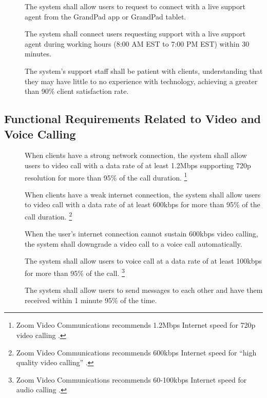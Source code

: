 \begin{description}
    \item[\textbf{\showfunchelpcounter}]
        The system shall allow users to request to connect with a live support
            agent from the GrandPad app or GrandPad tablet.
    \item[\textbf{\showfunchelpcounter}]
        The system shall connect users requesting support with a live support
            agent during working hours (8:00 AM EST to 7:00 PM EST) within 30
            minutes.
    \item[\textbf{\showfunchelpcounter}]
        The system's support staff shall be patient with clients, understanding
            that they may have little to no experience with technology,
            achieving a greater than 90\% client satisfaction rate.
\end{description}

\subsection*{Functional Requirements Related to Video and Voice Calling}

\begin{description}
    \item[\textbf{\showfunccallcounter}]
        When clients have a strong network connection, the system shall allow
            users to video call with a data rate of at least 1.2Mbps supporting
            720p resolution for more than 95\% of the call duration.
        \footnote{Zoom Video Communications recommends 1.2Mbps Internet speed
            for 720p video calling \cite{zoom_system_requirements}.}
    \item[\textbf{\showfunccallcounter}]
        When clients have a weak internet connection, the system shall allow
            users to video call with a data rate of at least 600kbps for more
            than 95\% of the call duration.
        \footnote{Zoom Video Communications recommends 600kbps Internet speed
            for ``high quality video calling'' \cite{zoom_system_requirements}.}
    \item[\textbf{\showfunccallcounter}]
        When the user's internet connection cannot sustain 600kbps video
            calling, the system shall downgrade a video call to a voice call
            automatically.
    \item[\textbf{\showfunccallcounter}]
        The system shall allow users to voice call at a data rate of at least
            100kbps for more than 95\% of the call.
        \footnote{Zoom Video Communications recommends 60-100kbps Internet speed
            for audio calling \cite{zoom_system_requirements}.}
    \item[\textbf{\showfunccallcounter}]
        The system shall allow users to send messages to each other and have
            them received within 1 minute 95\% of the time.
\end{description}

